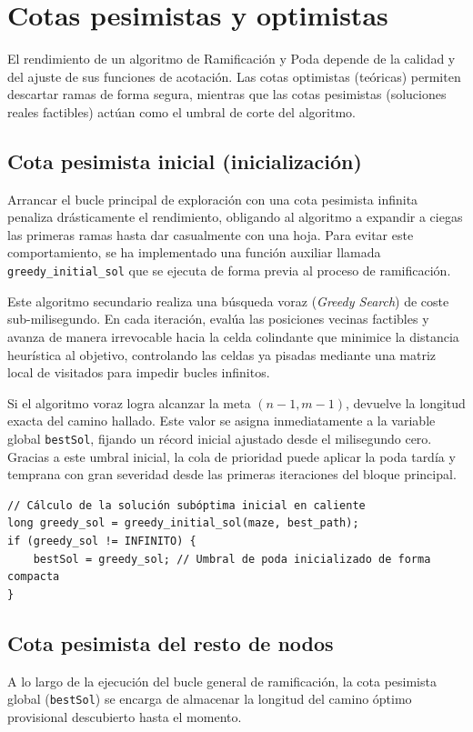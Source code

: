 \documentclass[11pt,a4paper]{article}
\begin{document}
\section{Cotas pesimistas y optimistas}
El rendimiento de un algoritmo de Ramificación y Poda depende de la calidad y del ajuste de sus funciones de acotación. Las cotas optimistas (teóricas) permiten descartar ramas de forma segura, mientras que las cotas pesimistas (soluciones reales factibles) actúan como el umbral de corte del algoritmo.

\subsection{Cota pesimista inicial (inicialización)}
Arrancar el bucle principal de exploración con una cota pesimista infinita penaliza drásticamente el rendimiento, obligando al algoritmo a expandir a ciegas las primeras ramas hasta dar casualmente con una hoja. Para evitar este comportamiento, se ha implementado una función auxiliar llamada \texttt{greedy\_initial\_sol} que se ejecuta de forma previa al proceso de ramificación.

Este algoritmo secundario realiza una búsqueda voraz (\textit{Greedy Search}) de coste sub-milisegundo. En cada iteración, evalúa las posiciones vecinas factibles y avanza de manera irrevocable hacia la celda colindante que minimice la distancia heurística al objetivo, controlando las celdas ya pisadas mediante una matriz local de visitados para impedir bucles infinitos. 

Si el algoritmo voraz logra alcanzar la meta $(n-1, m-1)$, devuelve la longitud exacta del camino hallado. Este valor se asigna inmediatamente a la variable global \texttt{bestSol}, fijando un récord inicial ajustado desde el milisegundo cero. Gracias a este umbral inicial, la cola de prioridad puede aplicar la poda tardía y temprana con gran severidad desde las primeras iteraciones del bloque principal.

\begin{lstlisting}[caption={Invocación e inicialización de la cota pesimista inicial}, label={lst:cota_inicial}]
// Cálculo de la solución subóptima inicial en caliente
long greedy_sol = greedy_initial_sol(maze, best_path);
if (greedy_sol != INFINITO) {
    bestSol = greedy_sol; // Umbral de poda inicializado de forma compacta
}
\end{lstlisting}

\subsection{Cota pesimista del resto de nodos}
A lo largo de la ejecución del bucle general de ramificación, la cota pesimista global (\texttt{bestSol}) se encarga de almacenar la longitud del camino óptimo provisional descubierto hasta el momento. 
\end{document}
